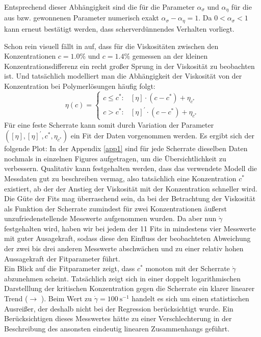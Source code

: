\documentclass[11pt,a4paper,oneside]{scrartcl}
\begin{document}
Entsprechend dieser Abhängigkeit sind die für die Parameter $\alpha_\sigma$ und $\alpha_\eta$ für die aus  bzw.  gewonnenen Parameter numerisch exakt $\alpha_\sigma-\alpha_\eta=1$. Da $0<\alpha_\sigma<1$ kann erneut bestätigt werden, dass scherverdünnendes Verhalten vorliegt. \par
Schon rein visuell fällt in  auf, dass für die Viskositäten zwischen den Konzentrationen $c=1.0\%$ und $c=1.4\%$ gemessen an der kleinen Konzentrationsdifferenz ein recht großer Sprung in der Viskosität zu beobachten ist. Und tatsächlich modelliert man die Abhängigkeit der Viskosität von der Konzentration bei Polymerlösungen häufig folgt:
\begin{equation}
\eta(c)=\begin{cases} c\leq c^*: & [\eta]\cdot(c-c^*)+\eta_{c^*}\\
c>c^*: & [\eta]^\prime\cdot(c-c^*)+\eta_{c^*}
\end{cases}
\end{equation}
Für eine feste Scherrate kann somit durch Variation der Parameter $([\eta],[\eta]^\prime,c^*,\eta_{c^*})$ ein Fit der Daten vorgenommen werden. Es ergibt sich der folgende Plot:
In der Appendix \ref{app1} sind für jede Scherrate dieselben Daten nochmals in einzelnen Figures aufgetragen, um die Übersichtlichkeit zu verbessern. Qualitativ kann festgehalten werden, dass das verwendete Modell die Messdaten gut zu beschreiben vermag, also tatsächlich eine Konzentration $c^*$ existiert, ab der der Anstieg der Viskosität mit der Konzentration schneller wird. \\
Die Güte der Fits mag überraschend sein, da bei der Betrachtung der Viskosität als Funktion der Scherrate zumindest für zwei Konzentrationen äußerst unzufriedenstellende Messwerte aufgenommen wurden. Da aber nun $\dot\gamma$ festgehalten wird, haben wir bei jedem der 11 Fits in  mindestens vier Messwerte mit guter Ausagekraft, sodass diese den Einfluss der beobachteten Abweichung der zwei bis drei anderen Messwerte abschwächen und zu einer relativ hohen Aussagekraft der Fitparameter führt.\\
Ein Blick auf die Fitparameter zeigt, dass $c^*$ monoton mit der Scherrate $\dot\gamma$ abzunehmen scheint. Tatsächlich zeigt sich in einer doppelt logarithmischen Darstelllung der kritischen Konzentration gegen die Scherrate ein klarer linearer Trend ($\rightarrow$ ). Beim Wert zu $\dot\gamma=100\ \mathrm s^{-1}$ handelt es sich um einen statistischen Ausreißer, der deshalb nicht bei der Regression berücksichtigt wurde. Ein Berücksichtigen dieses Messwertes hätte zu einer Verschlechterung in der Beschreibung des ansonsten eindeutig linearen Zusammenhangs geführt.
\end{document}
